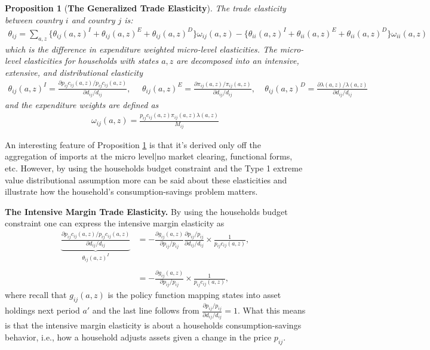 \documentclass[12pt,pdftex]{article}
\newtheorem{prp}{Proposition}
\begin{document}
\begin{onehalfspacing}
\begin{prp}[\textbf{The Generalized Trade Elasticity}] \label{apx-prp:GET} The trade elasticity between country $i$ and country $j$ is:
{\footnotesize
\begin{align}
\nonumber
\theta_{ij} = \sum_{a,z} \bigg \{ \theta_{ij}(a,z)^{I} + \theta_{ij}(a,z)^{E} + \theta_{ij}(a,z)^{D} \bigg \}\omega_{ij}(a,z) - \bigg \{ \theta_{ii}(a,z)^{I} + \theta_{ii}(a,z)^{E} + \theta_{ii}(a,z)^{D} \bigg \}\omega_{ii}(a,z)
\end{align}
}which is the difference in expenditure weighted micro-level elasticities. The micro-level elasticities for households with states $a,z$ are decomposed into an intensive, extensive, and distributional elasticity
{\footnotesize
\begin{align}
\nonumber
\theta_{ij}(a,z)^{I} = \frac{\partial p_{ij}c_{ij}(a,z)/ p_{ij}c_{ij}(a,z)}{\partial d_{ij} / d_{ij}}, \ \ \ \ \ \ \theta_{ij}(a,z)^{E} = \frac{\partial \pi_{ij}(a,z) / \pi_{ij}(a,z)}{\partial d_{ij} / d_{ij}}, \ \ \ \ \
\theta_{ij}(a,z)^{D} = \frac{\partial \lambda(a,z) / \lambda(a,z)}{\partial d_{ij} / d_{ij}}
\end{align}
}
and the expenditure weights are defined as
{\footnotesize
\begin{align}
\nonumber
\omega_{ij}(a,z) = \frac{p_{ij}c_{ij}(a,z)\pi_{ij}(a,z) \lambda(a,z)}{M_{ij}}
\end{align}
}
\end{prp}
An interesting feature of Proposition \ref{apx-prp:GET} is that it's derived only off the aggregation of imports at the micro level|no market clearing, functional forms, etc. However, by using the households budget constraint and the Type 1 extreme value distributional assumption more can be said about these elasticities and illustrate how the household's consumption-savings problem matters.

\textbf{The Intensive Margin Trade Elasticity.} By using the households budget constraint one can express the intensive margin elasticity as
\begin{align}
\underbrace{\frac{\partial p_{ij}c_{ij}(a,z)/ p_{ij}c_{ij}(a,z)}{\partial d_{ij} / d_{ij}}}_{\theta_{ij}(a,z)^{I}} &= -\frac{\partial g_{ij}(a,z)}{\partial p_{ij}/ p_{ij}} \frac{ \partial p_{ij}/ p_{ij}}{\partial d_{ij}/ d_{ij}} \times \frac{1}{p_{ij}c_{ij}(a,z)}, \\
\nonumber \\
&= -\frac{\partial g_{ij}(a,z)}{\partial p_{ij}/ p_{ij}} \times \frac{1}{p_{ij}c_{ij}(a,z)},
\end{align}
where recall that $g_{ij}(a,z)$ is the policy function mapping states into asset holdings next period $a'$ and the last line follows from $\frac{ \partial p_{ij}/ p_{ij}}{\partial d_{ij}/ d_{ij}} = 1$. What this means is that the intensive margin elasticity is about a households consumption-savings behavior, i.e., how a household adjusts assets given a change in the price $p_{ij}$. 


\end{onehalfspacing}
\end{document}
